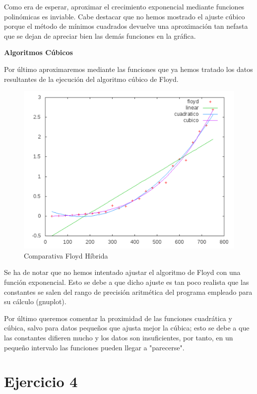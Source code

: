 \documentclass[a4paper, 11pt]{article}
\begin{document}
Como era de esperar, aproximar el crecimiento exponencial mediante funciones polinómicas es inviable. Cabe destacar que no hemos mostrado el ajuste cúbico porque el método de mínimos cuadrados devuelve una aproximación tan nefasta que se dejan de apreciar bien las demás funciones en la gráfica.

\vspace{1cm}

\textbf{Algoritmos Cúbicos}

Por último aproximaremos mediante las funciones que ya hemos tratado los datos resultantes de la ejecución del algoritmo cúbico de Floyd.

\begin{figure}[H]\includegraphics[width=13cm]{img/floyd_hibrida.pdf} \centering
	\caption{Comparativa Floyd Híbrida}\end{figure}

Se ha de notar que no hemos intentado ajustar el algoritmo de Floyd con una función exponencial. Esto se debe a que dicho ajuste es tan poco realista que las constantes se salen del rango de precisión aritmética del programa empleado para su cálculo (gnuplot).


Por último queremos comentar la proximidad de las funciones cuadrática y cúbica, salvo para datos pequeños que ajusta mejor la cúbica; esto se debe a que las constantes difieren mucho y los datos son insuficientes, por tanto, en un pequeño intervalo las funciones pueden llegar a "parecerse".

\newpage
\section{Ejercicio 4}
\end{document}
